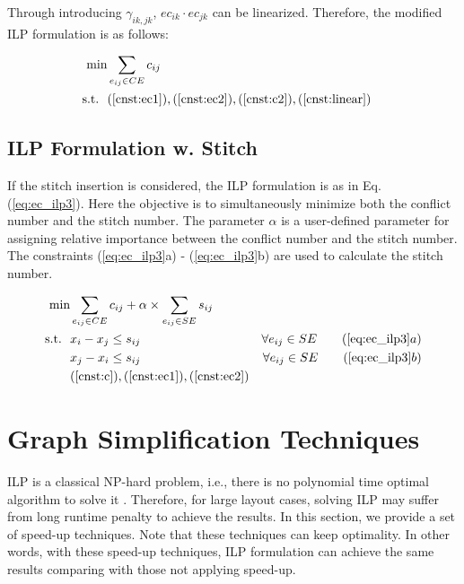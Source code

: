 \documentclass[12pt]{spieman}
\theoremstyle{plain}
\begin{document}
\begin{spacing}{1}
Through introducing $\gamma_{ik,jk}$, $ec_{ik} \cdot ec_{jk}$ can be linearized.
Therefore, the modified ILP formulation is as follows:

\begin{figure}[h]
\centering
\begin{align}
  \textrm{min}      &  \sum_{e_{ij} \in CE} c_{ij}                                               &\label{eq:ec_ilp2}\\
  \textrm{s.t.} \ \ & (\ref{cnst:ec1}), (\ref{cnst:ec2}), (\ref{cnst:c2}), (\ref{cnst:linear})   &\notag
\end{align}
\end{figure}
\fi

\subsection{ILP Formulation w. Stitch}
If the stitch insertion is considered, the ILP formulation is as in Eq. (\ref{eq:ec_ilp3}).
Here the objective is to simultaneously minimize both the conflict number and the stitch number.
The parameter $\alpha$ is a user-defined parameter for assigning relative importance between the conflict number and the stitch number.
The constraints (\ref{eq:ec_ilp3}a) - (\ref{eq:ec_ilp3}b) are used to calculate the stitch number.

\begin{figure}[htb]
\centering
\begin{align}
  \textrm{min} & \sum_{e_{ij}\in CE} c_{ij} + \alpha \times \sum_{e_{ij} \in SE} s_{ij} &      \label{eq:ec_ilp3} \\
  \textrm{s.t.} \ \ &  x_i - x_j \le s_{ij}                          & \forall e_{ij} \in SE   \tag{\ref{eq:ec_ilp3}$a$} \\
                    &  x_j - x_i \le s_{ij}                          & \forall e_{ij} \in SE   \tag{\ref{eq:ec_ilp3}$b$} \\
                    & (\ref{cnst:c}), (\ref{cnst:ec1}), (\ref{cnst:ec2}) &\notag
\end{align}
\end{figure}



\section{Graph Simplification Techniques}
\label{sec:tplec_speedup}


ILP is a classical NP-hard problem, i.e., there is no polynomial time optimal algorithm to solve it \cite{book90Algorithm}.
Therefore, for large layout cases, solving ILP may suffer from long runtime penalty to achieve the results.
In this section, we provide a set of speed-up techniques.
Note that these techniques can keep optimality.
In other words, with these speed-up techniques, ILP formulation can achieve the same results comparing with those not applying speed-up.


\end{spacing}
\end{document}
